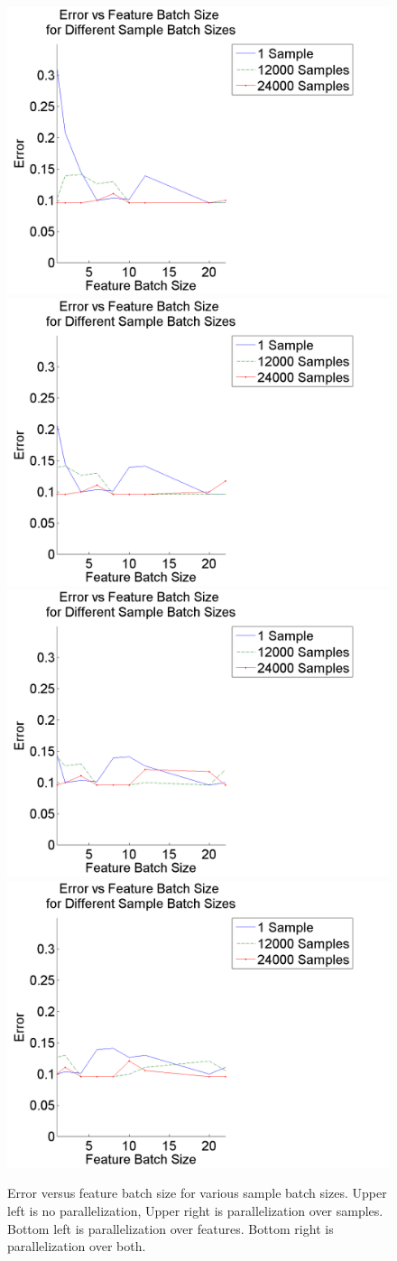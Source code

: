 \documentclass{article}
\begin{document}
\begin{figure}
\centering
\includegraphics[width = .4\linewidth]{featerrplot6}
\includegraphics[width = .4\linewidth]{featerrplot8}
\includegraphics[width = .4\linewidth]{featerrplot10}
\includegraphics[width = .4\linewidth]{featerrplot12}
\caption{Error versus feature batch size for various sample batch sizes. Upper left is no parallelization, Upper right is parallelization over samples. Bottom left is parallelization over features. Bottom right is parallelization over both.}
\label{fig:err_feat}
\end{figure}
\end{document}
